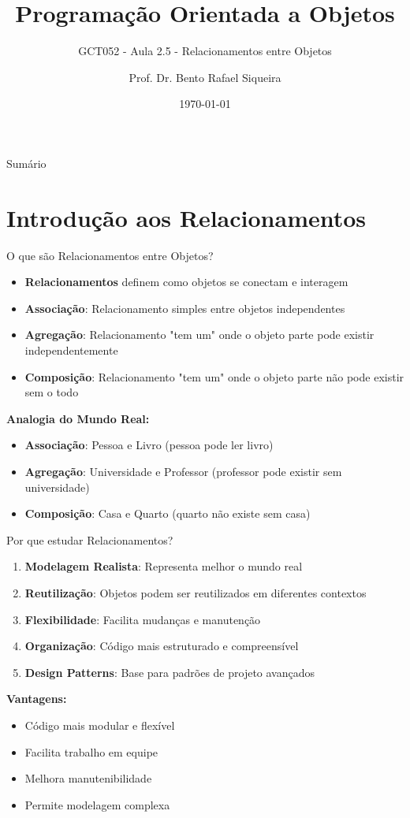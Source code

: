 \documentclass[aspectratio=169]{beamer}
\title{Programação Orientada a Objetos}
\subtitle{GCT052 - Aula 2.5 - Relacionamentos entre Objetos}
\author{Prof. Dr. Bento Rafael Siqueira}
\institute{Universidade Federal de Lavras\\Departamento de Ciência da Computação}
\date{\today}
\begin{document}
\begin{frame}
\titlepage
\end{frame}

\begin{frame}{Sumário}
\tableofcontents
\end{frame}

\section{Introdução aos Relacionamentos}

\begin{frame}{O que são Relacionamentos entre Objetos?}
\begin{itemize}
\item \textbf{Relacionamentos} definem como objetos se conectam e interagem
\item \textbf{Associação}: Relacionamento simples entre objetos independentes
\item \textbf{Agregação}: Relacionamento "tem um" onde o objeto parte pode existir independentemente
\item \textbf{Composição}: Relacionamento "tem um" onde o objeto parte não pode existir sem o todo
\end{itemize}

\vspace{0.5cm}
\textbf{Analogia do Mundo Real:}
\begin{itemize}
\item \textbf{Associação}: Pessoa e Livro (pessoa pode ler livro)
\item \textbf{Agregação}: Universidade e Professor (professor pode existir sem universidade)
\item \textbf{Composição}: Casa e Quarto (quarto não existe sem casa)
\end{itemize}
\end{frame}

\begin{frame}{Por que estudar Relacionamentos?}
\begin{enumerate}
\item \textbf{Modelagem Realista}: Representa melhor o mundo real
\item \textbf{Reutilização}: Objetos podem ser reutilizados em diferentes contextos
\item \textbf{Flexibilidade}: Facilita mudanças e manutenção
\item \textbf{Organização}: Código mais estruturado e compreensível
\item \textbf{Design Patterns}: Base para padrões de projeto avançados
\end{enumerate}

\vspace{0.5cm}
\textbf{Vantagens:}
\begin{itemize}
\item Código mais modular e flexível
\item Facilita trabalho em equipe
\item Melhora manutenibilidade
\item Permite modelagem complexa
\end{itemize}
\end{frame}
\end{document}
